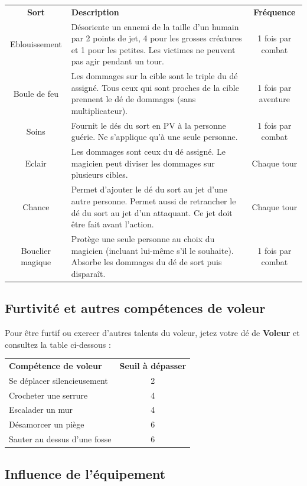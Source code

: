 \documentclass[a4paper, 11pt, twoside]{article}
\begin{document}
\begin{longtable}{cp{10cm}c}
\textbf{Sort} & \textbf{Description} & \textbf{Fréquence}\\
Eblouissement & Désoriente un ennemi de la taille d'un humain par 2 points de jet, 4 pour les grosses créatures et 1 pour les petites. Les victimes ne peuvent pas agir pendant un tour. & 1 fois par combat\\
Boule de feu & Les dommages sur la cible sont le triple du dé assigné. Tous ceux qui sont proches de la cible prennent le dé de dommages (sans multiplicateur). & 1 fois par aventure\\
Soins & Fournit le dés du sort en PV à la personne guérie. Ne s'applique qu'à une seule personne. & 1 fois par combat\\
Eclair & Les dommages sont ceux du dé assigné. Le magicien peut diviser les dommages sur plusieurs cibles. & Chaque tour\\
Chance & Permet d'ajouter le dé du sort au jet d'une autre personne. Permet aussi de retrancher le dé du sort au jet d'un attaquant. Ce jet doit être fait avant l'action. & Chaque tour\\
Bouclier magique & Protège une seule personne au choix du magicien (incluant lui-même s'il le souhaite). Absorbe les dommages du dé de sort puis disparaît. & 1 fois par combat\\
\end{longtable}

\subsection{Furtivité et autres compétences de voleur}
\label{sec:orgbdb258b}

Pour être furtif ou exercer d'autres talents du voleur, jetez votre dé de \textbf{Voleur} et consultez la table ci-dessous :

\begin{longtable}{lc}
\textbf{Compétence de voleur} & \textbf{Seuil à dépasser}\\
Se déplacer silencieusement & 2\\
Crocheter une serrure & 4\\
Escalader un mur & 4\\
Désamorcer un piège & 6\\
Sauter au dessus d'une fosse & 6\\
\end{longtable}

\subsection{Influence de l'équipement}
\label{sec:orga16824c}
\end{document}
